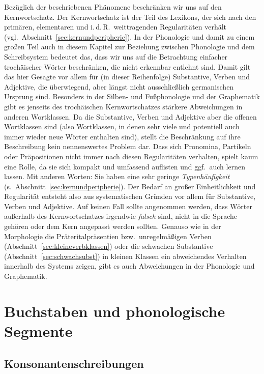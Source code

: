 Bezüglich der beschriebenen Phänomene beschränken wir uns auf den Kernwortschatz.
Der Kernwortschatz ist der Teil des Lexikons, der sich nach den primären, elementaren und i.\,d.\,R.\ weittragenden Regularitäten verhält (vgl.\ Abschnitt~\ref{sec:kernundperipherie}).
In der Phonologie und damit zu einem großen Teil auch in diesem Kapitel zur Beziehung zwischen Phonologie und dem Schreibsystem bedeutet das, dass wir uns auf die Betrachtung einfacher trochäischer Wörter beschränken, die nicht erkennbar entlehnt sind.
Damit gilt das hier Gesagte vor allem für (in dieser Reihenfolge) Substantive, Verben und Adjektive, die überwiegend, aber längst nicht ausschließlich germanischen Ursprung sind.
Besonders in der Silben- und Fußphonologie und der Graphematik gibt es jenseits des trochäischen Kernwortschatzes stärkere Abweichungen in anderen Wortklassen.
Da die Substantive, Verben und Adjektive aber die offenen Wortklassen sind (also Wortklassen, in denen sehr viele und potentiell auch immer wieder neue Wörter enthalten sind), stellt die Beschränkung auf ihre Beschreibung kein nennenswertes Problem dar.
Dass sich Pronomina, Partikeln oder Präpositionen nicht immer nach diesen Regularitäten verhalten, spielt kaum eine Rolle, da sie sich kompakt und umfassend auflisten und ggf.\ auch lernen lassen.
Mit anderen Worten:
Sie haben eine sehr geringe \textit{Typenhäufigkeit} (s.\ Abschnitt~\ref{sec:kernundperipherie}).
Der Bedarf an großer Einheitlichkeit und Regularität entsteht also aus systematischen Gründen vor allem für Substantive, Verben und Adjektive.
Auf keinen Fall sollte angenommen werden, dass Wörter außerhalb des Kernwortschatzes irgendwie \textit{falsch} sind, nicht in die Sprache gehören oder dem Kern angepasst werden sollten.
Genauso wie in der Morphologie die Präteritalpräsentien bzw.\ unregelmäßigen Verben (Abschnitt~\ref{sec:kleineverbklassen}) oder die schwachen Substantive (Abschnitt~\ref{sec:schwachsubst}) in kleinen Klassen ein abweichendes Verhalten innerhalb des Systems zeigen, gibt es auch Abweichungen in der Phonologie und Graphematik.

\section{Buchstaben und phonologische Segmente}

\label{sec:buchstabensegmente}

\subsection{Konsonantenschreibungen}

